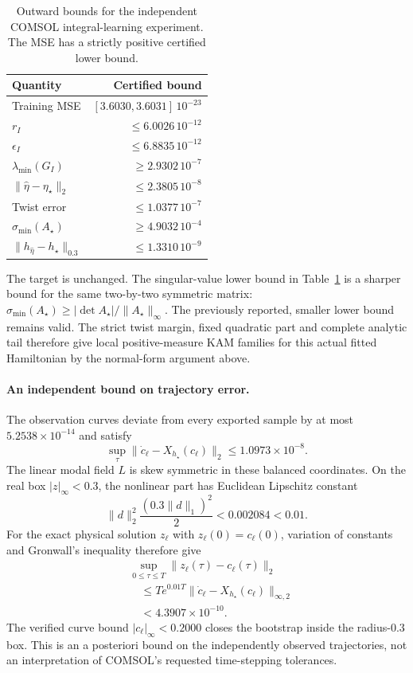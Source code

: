 \begin{table}[t]
\centering
\caption{Outward bounds for the independent COMSOL integral-learning
experiment. The MSE has a strictly positive certified lower bound.}
\label{tab:integral-certificate}
\begin{tabular}{lr}
\hline
Quantity & Certified bound\\
\hline
Training MSE & $[3.6030,3.6031]\,10^{-23}$\\
$r_I$ & $\leq6.0026\,10^{-12}$\\
$\epsilon_I$ & $\leq6.8835\,10^{-12}$\\
$\lambda_{\min}(G_I)$ & $\geq2.9302\,10^{-7}$\\
$\|\widehat\eta-\eta_\star\|_2$ & $\leq2.3805\,10^{-8}$\\
Twist error & $\leq1.0377\,10^{-7}$\\
$\sigma_{\min}(A_\star)$ & $\geq4.9032\,10^{-4}$\\
$\|h_{\widehat\eta}-h_\star\|_{0.3}$ & $\leq1.3310\,10^{-9}$\\
\hline
\end{tabular}
\end{table}

The target is unchanged. The singular-value lower bound in
Table~\ref{tab:integral-certificate} is a sharper bound for the same
two-by-two symmetric matrix:
$\sigma_{\min}(A_\star)\geq|\det A_\star|/\|A_\star\|_\infty$.
The previously reported, smaller lower bound remains valid.
The strict twist margin, fixed quadratic part and complete analytic
tail therefore give local positive-measure KAM families for this actual
fitted Hamiltonian by the normal-form argument above.

\paragraph{An independent bound on trajectory error.}
The observation curves deviate from every exported sample by at most
$5.2538\times10^{-14}$ and satisfy
\[
 \sup_\tau\|\dot c_\ell-X_{h_\star}(c_\ell)\|_2
 \leq1.0973\times10^{-8}.
\]
The linear modal field $L$ is skew symmetric in these balanced
coordinates. On the real box $|z|_\infty<0.3$, the nonlinear part has
Euclidean Lipschitz constant
\[
 \|d\|_2^2\frac{(0.3\|d\|_1)^2}{2}
 <0.002084<0.01 .
\]
For the exact physical solution $z_\ell$ with
$z_\ell(0)=c_\ell(0)$, variation of constants and Gronwall's inequality
therefore give
\[
 \begin{aligned}
 &\sup_{0\leq\tau\leq T}\|z_\ell(\tau)-c_\ell(\tau)\|_2\\
 &\quad\leq T e^{0.01T}
       \|\dot c_\ell-X_{h_\star}(c_\ell)\|_{\infty,2}\\
 &\quad<4.3907\times10^{-10}.
 \end{aligned}
\]
The verified curve bound $|c_\ell|_\infty<0.2000$ closes the
bootstrap inside the radius-$0.3$ box. This is an a posteriori bound
on the independently observed trajectories, not an interpretation of
COMSOL's requested time-stepping tolerances.


